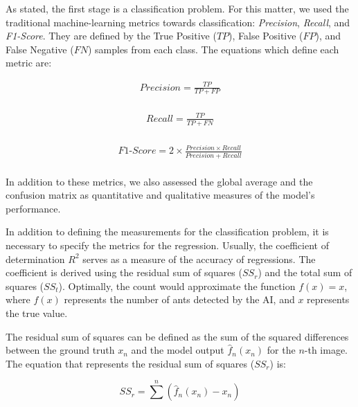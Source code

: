 As stated, the first stage is a classification problem. For this matter, we used the traditional machine-learning metrics towards classification: \textit{Precision}, \textit{Recall}, and \textit{F1-Score}. They are defined by the True Positive ($TP$), False Positive ($FP$), and False Negative ($FN$) samples from each class. The equations which define each metric are:

\begin{equation} \label{eq3}
\begin{split}
Precision =  \frac{TP}{TP + FP} \\
\end{split}
\end{equation}

 \begin{equation} \label{eq4}
\begin{split}
Recall =  \frac{TP }{TP + FN} \\
\end{split}
\end{equation}

\begin{equation} \label{eq5}
\begin{split}
F1\text{-}Score = 2 \times \frac{Precision \times Recall}{Precision + Recall} \\
\end{split}
\end{equation}

In addition to these metrics, we also assessed the global average and the confusion matrix as quantitative and qualitative measures of the model's performance. 

In addition to defining the measurements for the classification problem, it is necessary to specify the metrics for the regression. Usually, the coefficient of determination $R^2$ serves as a measure of the accuracy of regressions. The coefficient is derived using the residual sum of squares ($SS_r$) and the total sum of squares ($SS_t$). Optimally, the count would approximate the function $f(x) = x$, where $f(x)$ represents the number of ants detected by the AI, and $x$ represents the true value.

The residual sum of squares can be defined as the sum of the squared differences between the ground truth $x_n$ and the model output $\hat{f}_n(x_n)$ for the $n$-th image. The equation that represents the residual sum of squares ($SS_r$) is:

\begin{equation}
    SS_r = \sum^n (\hat{f}_n(x_n) - x_n) 
\end{equation}

